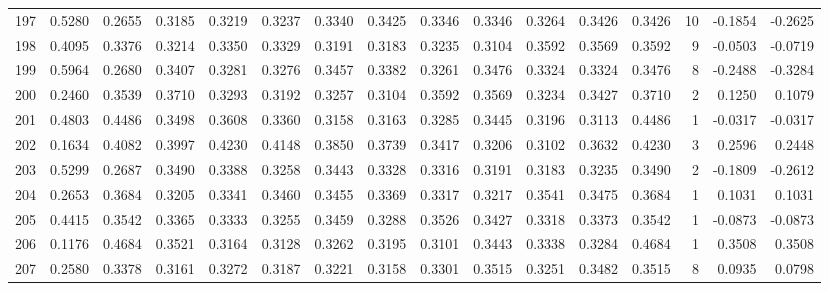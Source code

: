 \begin{tabular}{lrrrrrrrrrrrrrrr}
197 &      0.5280 &  0.2655 &  0.3185 &  0.3219 &  0.3237 &  0.3340 &  0.3425 &  0.3346 &  0.3346 &  0.3264 &   0.3426 &     0.3426 &     10 &                   -0.1854 &                    -0.2625 \\
198 &      0.4095 &  0.3376 &  0.3214 &  0.3350 &  0.3329 &  0.3191 &  0.3183 &  0.3235 &  0.3104 &  0.3592 &   0.3569 &     0.3592 &      9 &                   -0.0503 &                    -0.0719 \\
199 &      0.5964 &  0.2680 &  0.3407 &  0.3281 &  0.3276 &  0.3457 &  0.3382 &  0.3261 &  0.3476 &  0.3324 &   0.3324 &     0.3476 &      8 &                   -0.2488 &                    -0.3284 \\
200 &      0.2460 &  0.3539 &  0.3710 &  0.3293 &  0.3192 &  0.3257 &  0.3104 &  0.3592 &  0.3569 &  0.3234 &   0.3427 &     0.3710 &      2 &                    0.1250 &                     0.1079 \\
201 &      0.4803 &  0.4486 &  0.3498 &  0.3608 &  0.3360 &  0.3158 &  0.3163 &  0.3285 &  0.3445 &  0.3196 &   0.3113 &     0.4486 &      1 &                   -0.0317 &                    -0.0317 \\
202 &      0.1634 &  0.4082 &  0.3997 &  0.4230 &  0.4148 &  0.3850 &  0.3739 &  0.3417 &  0.3206 &  0.3102 &   0.3632 &     0.4230 &      3 &                    0.2596 &                     0.2448 \\
203 &      0.5299 &  0.2687 &  0.3490 &  0.3388 &  0.3258 &  0.3443 &  0.3328 &  0.3316 &  0.3191 &  0.3183 &   0.3235 &     0.3490 &      2 &                   -0.1809 &                    -0.2612 \\
204 &      0.2653 &  0.3684 &  0.3205 &  0.3341 &  0.3460 &  0.3455 &  0.3369 &  0.3317 &  0.3217 &  0.3541 &   0.3475 &     0.3684 &      1 &                    0.1031 &                     0.1031 \\
205 &      0.4415 &  0.3542 &  0.3365 &  0.3333 &  0.3255 &  0.3459 &  0.3288 &  0.3526 &  0.3427 &  0.3318 &   0.3373 &     0.3542 &      1 &                   -0.0873 &                    -0.0873 \\
206 &      0.1176 &  0.4684 &  0.3521 &  0.3164 &  0.3128 &  0.3262 &  0.3195 &  0.3101 &  0.3443 &  0.3338 &   0.3284 &     0.4684 &      1 &                    0.3508 &                     0.3508 \\
207 &      0.2580 &  0.3378 &  0.3161 &  0.3272 &  0.3187 &  0.3221 &  0.3158 &  0.3301 &  0.3515 &  0.3251 &   0.3482 &     0.3515 &      8 &                    0.0935 &                     0.0798 \\

\end{tabular}
